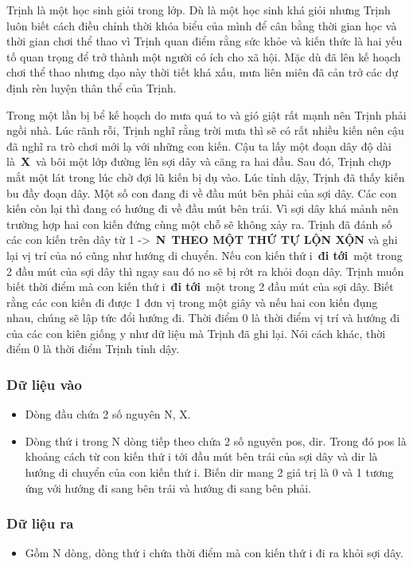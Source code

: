 

Trịnh là một học sinh giỏi trong lớp. Dù là một học sinh khá giỏi nhưng Trịnh luôn biết cách điều chỉnh thời khóa biểu của mình để cân bằng thời gian học và thời gian chơi thể thao vì Trịnh quan điểm rằng sức khỏe và kiến thức là hai yếu tố quan trọng để trở thành một người có ích cho xã hội. Mặc dù đã lên kế hoạch chơi thể thao nhưng dạo này thời tiết khá xấu, mưa liên miên đã cản trở các dự định rèn luyện thân thể của Trịnh.

Trong một lần bị bể kế hoạch do mưa quá to và gió giật rất mạnh nên Trịnh phải ngồi nhà. Lúc rãnh rỗi, Trịnh nghĩ rằng trời mưa thì sẽ có rất nhiều kiến nên cậu đã nghĩ ra trò chơi mới lạ với những con kiến. Cậu ta lấy một đoạn dây độ dài là \textbf{X} và bôi một lớp đường lên sợi dây và căng ra hai đầu. Sau đó, Trịnh chợp mắt một lát trong lúc chờ đợi lũ kiến bị dụ vào. Lúc tỉnh dậy, Trịnh đã thấy kiến bu đầy đoạn dây. Một số con đang đi về đầu mút bên phải của sợi dây. Các con kiến còn lại thì đang có hướng đi về đầu mút bên trái. Vì sợi dây khá mảnh nên trường hợp hai con kiến đứng cùng một chỗ sẽ không xảy ra. Trịnh đã đánh số các con kiến trên dây từ 1 -> \textbf{N} \textbf{THEO MỘT THỨ TỰ LỘN XỘN} và ghi lại vị trí của nó cũng như hướng di chuyển. Nếu con kiến thứ i \textbf{đi tới} một trong 2 đầu mút của sợi dây thì ngay sau đó no sẽ bị rớt ra khỏi đoạn dây. Trịnh muốn biết thời điểm mà con kiến thứ i \textbf{đi tới} một trong 2 đầu mút của sợi dây. Biết rằng các con kiến đi được 1 đơn vị trong một giây và nếu hai con kiến đụng nhau, chúng sẽ lập tức đổi hướng đi. Thời điểm 0 là thời điểm vị trí và hướng đi của các con kiên giống y như dữ liệu mà Trịnh đã ghi lại. Nói cách khác, thời điểm 0 là thời điểm Trịnh tỉnh dậy.

\subsubsection{Dữ liệu vào}
\begin{itemize}
	\item Dòng đầu chứa 2 số nguyên N, X.
	\item Dòng thứ i trong N dòng tiếp theo chứa 2 số nguyên pos, dir. Trong đó pos là khoảng cách từ con kiến thứ i tới đầu mút bên trái của sợi dây và dir là hướng di chuyển của con kiến thứ i. Biến dir mang 2 giá trị là 0 và 1 tương ứng với hướng đi sang bên trái và hướng đi sang bên phải.
\end{itemize}

\subsubsection{Dữ liệu ra}
\begin{itemize}
	\item Gồm N dòng, dòng thứ i chứa thời điểm mà con kiến thứ i đi ra khỏi sợi dây.
\end{itemize}

